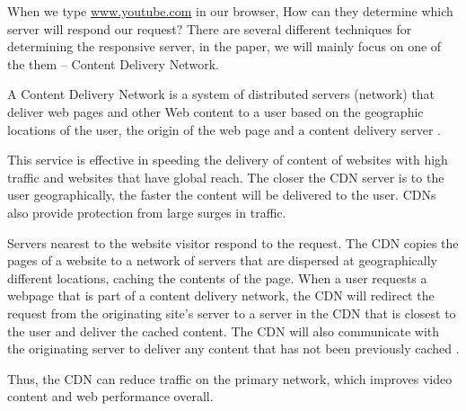 When we type \url{www.youtube.com} in our browser, How can they determine which server will respond our request? There are several different techniques for determining the responsive server, in the paper, we will mainly focus on one of the them -- Content Delivery Network.

A Content Delivery Network is a system of distributed servers (network) that deliver web pages and other Web content to a user based on the geographic locations of the user, the origin of the web page and a content delivery server .

This service is effective in speeding the delivery of content of websites with high traffic and websites that have global reach. The closer the CDN server is to the user geographically, the faster the content will be delivered to the user. CDNs also provide protection from large surges in traffic.

Servers nearest to the website visitor respond to the request. The CDN copies the pages of a website to a network of servers that are dispersed at geographically different locations, caching the contents of the page. When a user requests a webpage that is part of a content delivery network, the CDN will redirect the request from the originating site's server to a server in the CDN that is closest to the user and deliver the cached content. The CDN will also communicate with the originating server to deliver any content that has not been previously cached .

Thus, the CDN can reduce traffic on the primary network, which improves video content and web performance overall.
